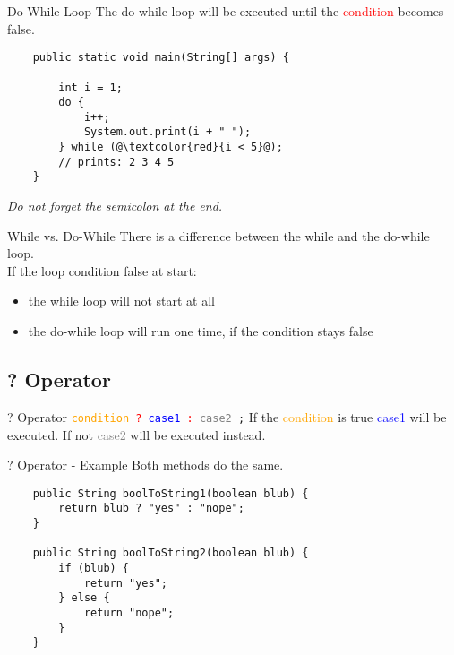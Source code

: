 \begin{frame}[fragile]{Do-While Loop}
	The do-while loop will be executed until the \textcolor{red}{condition} becomes false.
	\begin{lstlisting}
	public static void main(String[] args) {
	
	    int i = 1;
	    do {
	        i++;
	        System.out.print(i + " ");
	    } while (@\textcolor{red}{i < 5}@);
	    // prints: 2 3 4 5
	}
	\end{lstlisting}
	\emph{Do not forget the semicolon at the end.}
\end{frame}

\begin{frame}{While vs. Do-While}
	There is a difference between the while and the do-while loop. \\
	\vfill
	If the loop condition false at start:
	\begin{itemize}
		\item the while loop will not start at all
		\item the do-while loop will run one time, if the condition stays false
	\end{itemize}
\end{frame}

\subsection{? Operator}
\begin{frame}{? Operator}
	\texttt{\textcolor{orange}{condition} \textcolor{red}{?} \textcolor{blue}{case1} 
		\textcolor{red}{:} \textcolor{gray}{case2} ;}
	\vfill
	If the \textcolor{orange}{condition} is true \textcolor{blue}{case1} will be executed.
	If not \textcolor{gray}{case2} will be executed instead.
\end{frame}
\begin{frame}[fragile]{? Operator - Example}
	Both methods do the same.
	\vfill
	\begin{lstlisting}
	public String boolToString1(boolean blub) {
	    return blub ? "yes" : "nope";
	}
	
	public String boolToString2(boolean blub) {
	    if (blub) {
	        return "yes";
	    } else { 
	        return "nope";
	    }
	}
	\end{lstlisting}
\end{frame}

